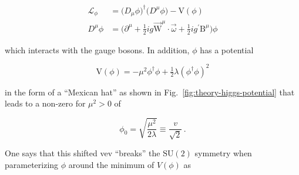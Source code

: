 
\begin{subequations}
\begin{align}
\mathcal{L}_{\phi}&=\big(D_{\mu}\phi\big)^{\dagger}\big(D^{\mu}\phi\big)-\mathrm{V}(\phi) \label{eq:theory-phi-propagator} \\
D^{\mu}\phi&=\big(\partial^{\mu}+\tfrac{1}{2}ig\vec{\mathrm{W}}^{\mu}\cdot\vec{\omega}+\tfrac{1}{2}ig^{\prime}\mathrm{B}^{\mu}\big)\phi \label{eq:theory-phi-codev}
\end{align}
\end{subequations}

which interacts with the gauge bosons. In addition, $\phi$ has a potential 

\begin{equation}
\mathrm{V}(\phi)=-\mu^2\phi^\dagger\phi+\tfrac{1}{2}\lambda(\phi^\dagger\phi)^2
\end{equation}

in the form of a ``Mexican hat'' as shown in Fig.~\ref{fig:theory-higgs-potential} that leads to a non-zero  for $\mu^2>0$ of 

\begin{equation}
\phi_0=\sqrt{\frac{\mu^{2}}{2\lambda}}\equiv \frac{v}{\sqrt{2}}\,.
\end{equation}


One says that this shifted \gls{vev} ``breaks'' the $\mathrm{SU(2)}$ symmetry when parameterizing $\phi$ around the minimum of $V(\phi)$ as

